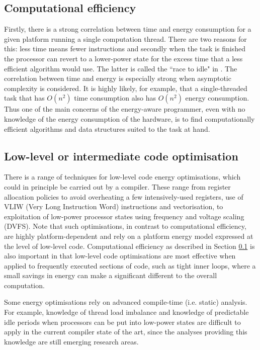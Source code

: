\documentclass[oneside]{book}
\begin{document}
\subsection{Computational efficiency}\label{compeff}
Firstly, there is a strong correlation between time and energy consumption for a given platform running a single computation thread. There are two reasons for this: less time means fewer instructions and secondly when the task is finished the processor can revert to a lower-power state for the excess time that a less efficient algorithm would use. The latter is called the ``race to idle" in \cite{Steigerwald_Agrawal_2011}. The correlation between time and energy is especially strong when asymptotic complexity is considered.  It is highly likely, for example, that a single-threaded task that has $O(n^2)$ time consumption also has $O(n^2)$ energy consumption.  Thus one of the main concerns of the energy-aware programmer, even with no knowledge of the energy consumption of the hardware, is to find computationally efficient algorithms and data structures suited to the task at hand.

\subsection{Low-level or intermediate code optimisation}
There is a range of techniques for low-level code energy optimisations, which could in principle be carried out by a compiler.  These range from register allocation policies to avoid overheating a few intensively-used registers, use of VLIW (Very Long Instruction Word) instructions and vectorisation, to exploitation of low-power processor states using frequency and voltage scaling (DVFS).  Note that such optimisations, in contrast to computational efficiency, are highly platform-dependent and rely on a platform energy model expressed at the level of low-level code.  Computational efficiency as described in Section \ref{compeff} is also important  in that low-level code optimisations are most effective when applied to frequently executed sections of code, such as tight inner loops, where a small savings in energy can make a significant different to the overall computation. 

Some energy optimisations rely on advanced compile-time (i.e. static) analysis. For example, knowledge of thread load imbalance and knowledge of predictable idle periods when processors can be put into low-power states are difficult to apply in the current compiler state of the art, since the analyses providing this knowledge are still emerging research areas.
\end{document}
